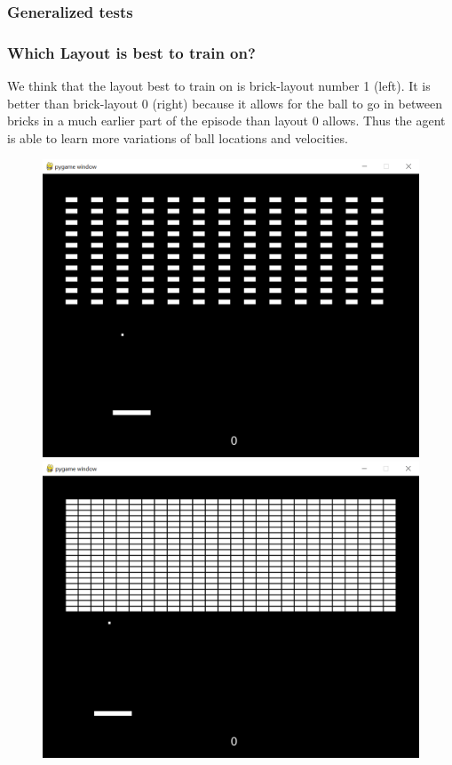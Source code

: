 \documentclass[twoside,11pt]{article}
\begin{document}
\subsubsection{Generalized tests}
\subsubsection{Which Layout is best to train on?}
We think that the layout best to train on is brick-layout number 1 (left). It is better than brick-layout 0 (right) because it allows for the ball to go in between bricks in a much earlier part of the episode than layout 0 allows. Thus the agent is able to learn more variations of ball locations and velocities.
\begin{figure}[H]
\includegraphics[scale=0.3]{bricklayout1}
\includegraphics[scale=0.3]{bricklayout0}
\centering
\end{figure}
\end{document}
